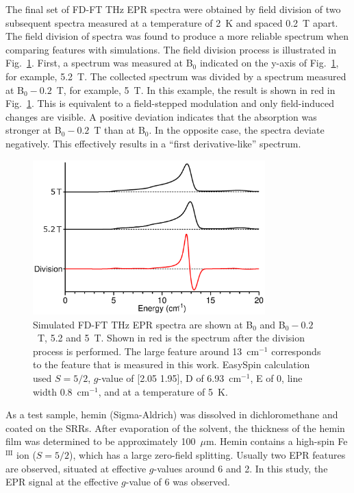 The final set of FD-FT THz EPR spectra were obtained by field division of two subsequent spectra measured at a temperature of 2~K and spaced 0.2~T apart. The field division of spectra was found to produce a more reliable spectrum when comparing features with simulations. \cite{Schnegg09,Nehrkorn13,NEHRKORN201710} The field division process is illustrated in Fig.~\ref{ch4-fig:FDS}. First, a spectrum was measured at B$_0$ indicated on the y-axis of Fig.~\ref{ch4-fig:FDS}, for example, 5.2~T. The collected spectrum was divided by a spectrum measured at B$_0 - 0.2$~T, for example, 5~T. In this example, the result is shown in red in Fig.~\ref{ch4-fig:FDS}. This is equivalent to a field-stepped modulation and only field-induced changes are visible. A positive deviation indicates that the absorption was stronger at B$_0 - 0.2$~T than at B$_0$. In the opposite case, the spectra deviate negatively. This effectively results in a ``first derivative-like'' spectrum.

\begin{figure}[htp]
\centering
  \includegraphics[width=0.8\textwidth]{Kapitel/Ch4-Images/Ch4-ExperimentExplain.eps}
  \caption[FD-FT THz EPR field division of spectra]{Simulated FD-FT THz EPR spectra are shown at B$_0$ and B$_0 - 0.2$~T, 5.2 and 5~T. Shown in red is the spectrum after the division process is performed. The large feature around 13~cm$^{-1}$ corresponds to the feature that is measured in this work. EasySpin calculation used $S=5/2$, $g$-value of [2.05 1.95], D of 6.93~cm$^{-1}$, E of 0, line width 0.8~cm$^{-1}$, and at a temperature of 5~K.}
  \label{ch4-fig:FDS}
\end{figure}

As a test sample, hemin (Sigma-Aldrich) was dissolved in dichloromethane and coated on the SRRs. After evaporation of the solvent, the thickness of the hemin film was determined to be approximately 100~$\mu$m. Hemin contains a high-spin Fe$^\text{III}$ ion ($S = 5/2$), which has a large zero-field splitting. \cite{Nehrkorn15,Johnson66,Marathe73,Lang66} Usually two EPR features are observed, situated at effective $g$-values around 6 and 2. \cite{Pilbrow90} In this study, the EPR signal at the effective $g$-value of 6 was observed. 

